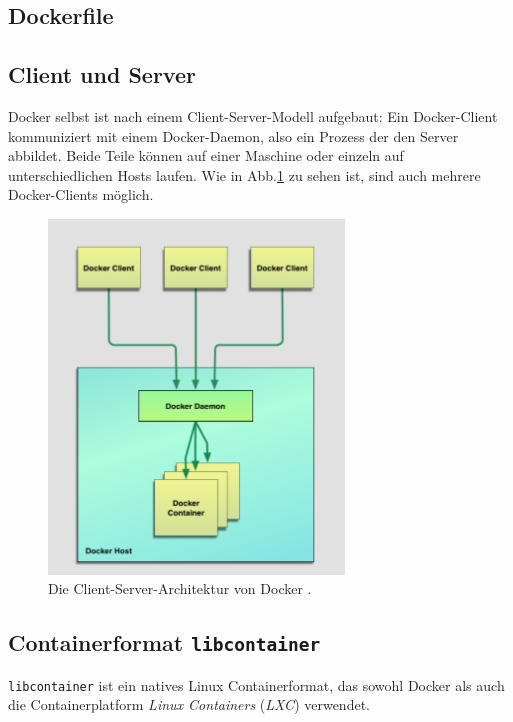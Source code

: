 \documentclass[11pt,a4paper,oneside]{report}
\newcommand{\fig}{Abb.}
\begin{document}
    \subsection{Dockerfile}


    \subsection{Client und Server}
      Docker selbst ist nach einem Client-Server-Modell aufgebaut: Ein Docker-Client kommuniziert mit einem Docker-Daemon, also ein Prozess der den Server abbildet. Beide Teile können auf einer Maschine oder einzeln auf unterschiedlichen Hosts laufen. Wie in \fig \ref{fig:intro_dockerArchitecture} zu sehen ist, sind auch mehrere Docker-Clients möglich.

      \begin{figure}[h]
          \centering
          \includegraphics[width=0.7\textwidth]{./images/intro_dockerArchitecture.jpg}
          \caption{Die Client-Server-Architektur von Docker \cite[S.10]{dockerBook}.}
          \label{fig:intro_dockerArchitecture}
      \end{figure}


    \subsection{Containerformat \texttt{libcontainer}}
      \texttt{libcontainer} ist ein natives Linux Containerformat, das sowohl Docker als auch die Containerplatform \emph{Linux Containers} (\emph{LXC}) verwendet.
\end{document}
